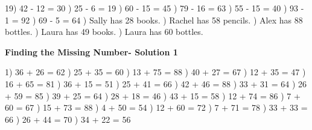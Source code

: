 \documentclass{article}%
\begin{document}
19) 42 {-} 12 = 30%
) 25 {-} 6 = 19%
) 60 {-} 15 = 45%
) 79 {-} 16 = 63%
) 55 {-} 15 = 40%
) 93 {-} 1 = 92%
) 69 {-} 5 = 64%
) Sally has 28 books.%
) Rachel has 58 pencils.%
) Alex has 88 bottles.%
) Laura has 49 books.%
) Laura has 60 bottles.%
\newline%
\newpage%
\large%
\begin{center}%
\textbf{Finding the Missing Number- Solution 1}%
\newline%
\end{center} \normalsize%
1) 36 + 26 = 62%
) 25 + 35 = 60%
) 13 + 75 = 88%
) 40 + 27 = 67%
) 12 + 35 = 47%
) 16 + 65 = 81%
) 36 + 15 = 51%
) 25 + 41 = 66%
) 42 + 46 = 88%
) 33 + 31 = 64%
) 26 + 59 = 85%
) 39 + 25 = 64%
) 28 + 18 = 46%
) 43 + 15 = 58%
) 12 + 74 = 86%
) 7 + 60 = 67%
) 15 + 73 = 88%
) 4 + 50 = 54%
) 12 + 60 = 72%
) 7 + 71 = 78%
) 33 + 33 = 66%
) 26 + 44 = 70%
) 34 + 22 = 56%
\end{document}

